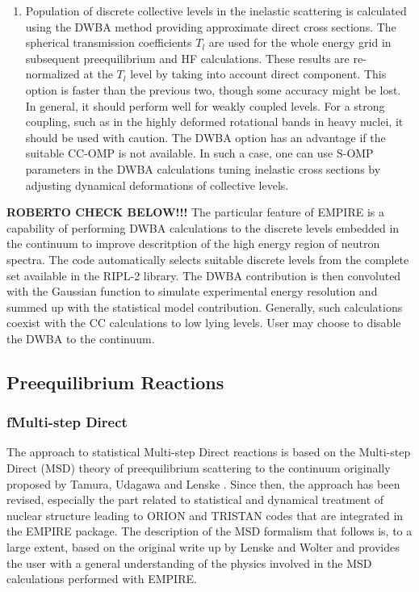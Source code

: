 \documentclass[twocolumn,amsmath,amssymb,10pt,groupedaddress,a4paper]{revtex4}
\begin{document}
\begin{enumerate}
\item Population of discrete collective levels in the inelastic
scattering is calculated using the DWBA method providing
approximate direct cross sections. The spherical transmission coefficients
$T_{l}$ are used for the whole energy grid in subsequent preequilibrium
and HF calculations. These results are re-normalized
at the $T_{l}$ level by taking into account direct component.
This option is faster than the previous two, though some accuracy might be lost. In general,
it should perform well for weakly coupled levels. For a strong coupling,
such as in the highly deformed rotational bands in heavy nuclei, it
should be used with caution. The DWBA option has an advantage
if the suitable CC-OMP is not available. In such a case, one can use
S-OMP parameters in the DWBA calculations tuning inelastic cross sections
by adjusting dynamical deformations of collective levels.
\end{enumerate}

\textbf{ROBERTO CHECK BELOW!!!}
The particular feature of EMPIRE is a capability of performing DWBA calculations to the
discrete levels embedded in the continuum to improve descritption of the high energy region
of neutron spectra. The code automatically selects suitable discrete levels from
the complete set available in the RIPL-2 library. The DWBA contribution is then convoluted
with the Gaussian function to simulate experimental energy resolution and summed up with the statistical model contribution. Generally, such calculations coexist with the CC calculations to low lying levels. User may choose to disable the DWBA to the continuum.

\subsection{Preequilibrium Reactions}

\subsubsection{fMulti-step Direct\label{sec: MSD}}


The approach to statistical Multi-step Direct reactions
is based on the Multi-step Direct (MSD) theory of preequilibrium scattering
to the continuum originally proposed by Tamura, Udagawa and Lenske
\cite{TUL}. Since then, the approach has been revised, especially
the part related to statistical and dynamical treatment of nuclear
structure leading to ORION and TRISTAN codes that are integrated in
the EMPIRE package. The description of the MSD formalism that follows
is, to a large extent, based on the original write up by Lenske and Wolter and
provides the user with a general understanding of the physics involved
in the MSD calculations performed with EMPIRE.
\end{document}
